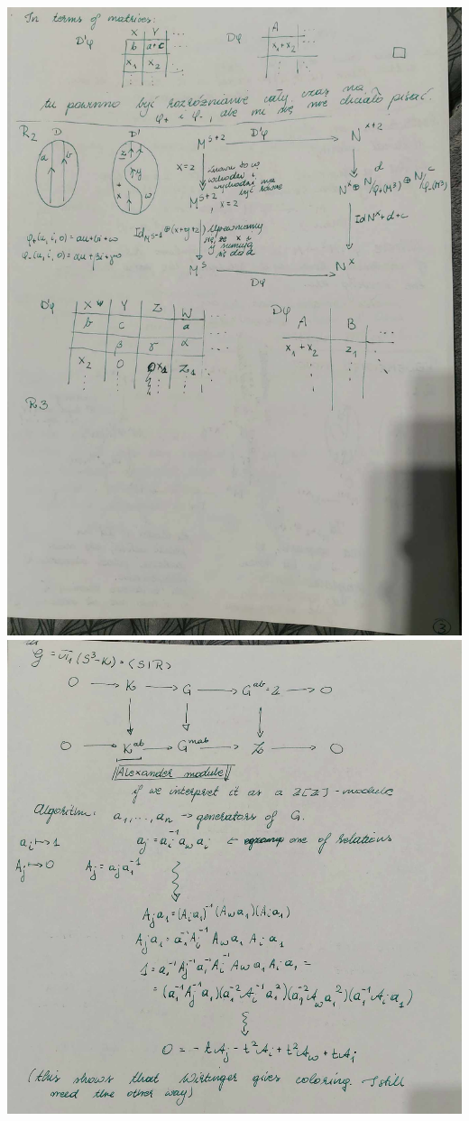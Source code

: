 \documentclass{article}
\begin{document}
\includegraphics[width=\textwidth]{03.jpg}
\includegraphics[width=\textwidth]{04.jpg}
\end{document}
